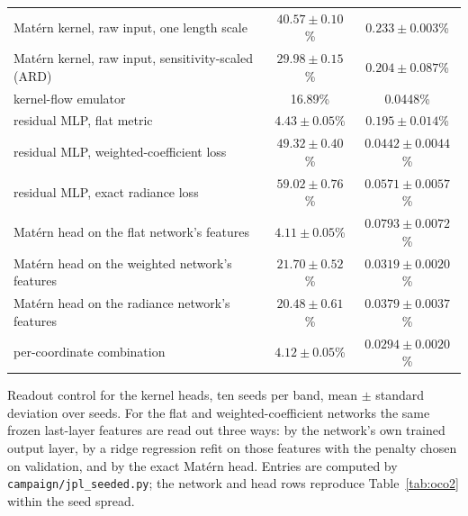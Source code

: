 \begin{table}[t]
\begin{adjustbox}{max width=\linewidth}
\begin{tabular}{lcc}
Mat\'ern kernel, raw input, one length scale & $40.57\pm0.10$\% & $0.233\pm0.003$\% \\
Mat\'ern kernel, raw input, sensitivity-scaled (ARD) & $29.98\pm0.15$\% & $0.204\pm0.087$\% \\
kernel-flow emulator \citep{susiluoto2025radiative} & 16.89\% & 0.0448\% \\
residual MLP, flat metric & $4.43\pm0.05$\% & $0.195\pm0.014$\% \\
residual MLP, weighted-coefficient loss & $49.32\pm0.40$\% & $0.0442\pm0.0044$\% \\
residual MLP, exact radiance loss & $59.02\pm0.76$\% & $0.0571\pm0.0057$\% \\
Mat\'ern head on the flat network's features & $4.11\pm0.05$\% & $0.0793\pm0.0072$\% \\
Mat\'ern head on the weighted network's features & $21.70\pm0.52$\% & $0.0319\pm0.0020$\% \\
Mat\'ern head on the radiance network's features & $20.48\pm0.61$\% & $0.0379\pm0.0037$\% \\
per-coordinate combination & $\mathbf{4.12\pm0.05}$\% & $\mathbf{0.0294\pm0.0020}$\% \\
\bottomrule
\end{tabular}
\end{adjustbox}
\end{table}

\begin{table}[t]
\centering
\caption{Readout control for the kernel heads, ten seeds per band, mean
$\pm$ standard deviation over seeds. For the flat and weighted-coefficient
networks the same
frozen last-layer features are read out three ways: by the network's own
trained output layer, by a ridge regression refit on those features with
the penalty chosen on validation, and by the exact Mat\'ern head. Entries are
computed by \texttt{campaign/jpl\_seeded.py}; the network and head rows
reproduce Table~\ref{tab:oco2} within the seed spread.}
\label{tab:oco2ridge}

\end{table}

